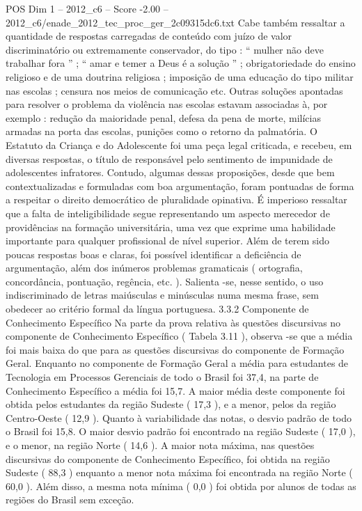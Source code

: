 \begin{textsample}{POS Dim 1 – 2012\_c6 – Score -2.00 – 2012\_c6/enade\_2012\_tec\_proc\_ger\_2c09315dc6.txt}
Cabe também ressaltar a quantidade de respostas carregadas de conteúdo com juízo de valor discriminatório ou extremamente conservador, do tipo : “ mulher não deve trabalhar fora ” ; “ amar e temer a Deus é a solução ” ; obrigatoriedade do ensino religioso e de uma doutrina religiosa ; imposição de uma educação do tipo militar nas escolas ; censura nos meios de comunicação etc.
Outras soluções apontadas para resolver o problema da violência nas escolas estavam associadas à, por exemplo : redução da maioridade penal, defesa da pena de morte, milícias armadas na porta das escolas, punições como o retorno da palmatória.
O Estatuto da Criança e do Adolescente foi uma peça legal criticada, e recebeu, em diversas respostas, o título de responsável pelo sentimento de impunidade de adolescentes infratores.
Contudo, algumas dessas proposições, desde que bem contextualizadas e formuladas com boa argumentação, foram pontuadas de forma a respeitar o direito democrático de pluralidade opinativa.
É imperioso ressaltar que a falta de inteligibilidade segue representando um aspecto merecedor de providências na formação universitária, uma vez que exprime uma habilidade importante para qualquer profissional de nível superior.
Além de terem sido poucas respostas boas e claras, foi possível identificar a deficiência de argumentação, além dos inúmeros problemas gramaticais ( ortografia, concordância, pontuação, regência, etc. ).
Salienta -se, nesse sentido, o uso indiscriminado de letras maiúsculas e minúsculas numa mesma frase, sem obedecer ao critério formal da língua portuguesa. 3.3.2 Componente de Conhecimento Específico Na parte da prova relativa às questões discursivas no componente de Conhecimento Específico ( Tabela 3.11 ), observa -se que a média foi mais baixa do que para as questões discursivas do componente de Formação Geral.
Enquanto no componente de Formação Geral a média para estudantes de Tecnologia em Processos Gerenciais de todo o Brasil foi 37,4, na parte de Conhecimento Específico a média foi 15,7.
A maior média deste componente foi obtida pelos estudantes da região Sudeste ( 17,3 ), e a menor, pelos da região Centro-Oeste ( 12,9 ).
Quanto à variabilidade das notas, o desvio padrão de todo o Brasil foi 15,8.
O maior desvio padrão foi encontrado na região Sudeste ( 17,0 ), e o menor, na região Norte ( 14,6 ).
A maior nota máxima, nas questões discursivas do componente de Conhecimento Específico, foi obtida na região Sudeste ( 88,3 ) enquanto a menor nota máxima foi encontrada na região Norte ( 60,0 ).
Além disso, a mesma nota mínima ( 0,0 ) foi obtida por alunos de todas as regiões do Brasil sem exceção.

\end{textsample}
